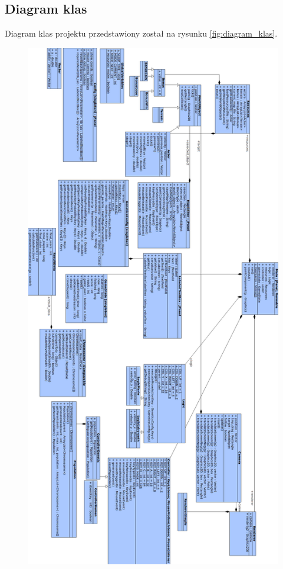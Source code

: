 \subsection{Diagram klas}
\begin{par}
	\begin{par}
	Diagram klas projektu przedstawiony został na rysunku \ref{fig:diagram_klas}.
	\end{par}
	\begin{figure}[!h]
	\centering
	\includegraphics[height=\textheight]{obrazki/diagram_klas.png}

\end{figure}
\end{par}
